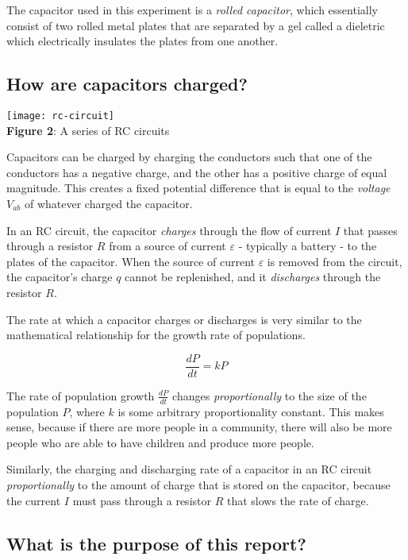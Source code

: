 \documentclass[12pt]{article}
\begin{document}
The capacitor used in this experiment is a \emph{rolled capacitor}, which essentially consist of two rolled metal plates that are separated by a gel called a dieletric which electrically insulates the plates from one another.

\subsection*{How are capacitors charged?}



\begin{center} \texttt{[image: rc-circuit]} \\ \footnotesize \textbf{Figure 2}: A series of RC circuits \end{center}

Capacitors can be charged by charging the conductors such that one of the conductors has a negative charge, and the other has a positive charge of equal magnitude. This creates a fixed potential difference that is equal to the \emph{voltage $V_{ab}$} of whatever charged the capacitor.

In an RC circuit, the capacitor \emph{charges} through the flow of current $I$ that passes through a resistor $R$ from a source of current $\varepsilon$ - typically a battery - to the plates of the capacitor.  When the source of current $\varepsilon$ is removed from the circuit, the capacitor's charge $q$ cannot be replenished, and it \emph{discharges} through the resistor $R$.

The rate at which a capacitor charges or discharges is very similar to the mathematical relationship for the growth rate of populations.

$$ \frac{dP}{dt} = kP $$ 

The rate of population growth $\frac{dP}{dt}$ changes \emph{proportionally} to the size of the population $P$, where $k$ is some arbitrary proportionality constant. This makes sense, because if there are more people in a community, there will also be more people who are able to have children and produce more people. 


Similarly, the charging and discharging rate of a capacitor in an RC circuit \emph{proportionally} to the amount of charge that is stored on the capacitor, because the current $I$ must pass through a resistor $R$ that slows the rate of charge.


\subsection*{What is the purpose of this report?}
\end{document}
